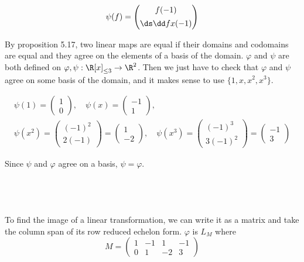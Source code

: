 \documentclass[a4paper]{article}
\begin{document}
\subsection{~}

$$\psi(f) = \begin{pmatrix} f(-1) \\[1ex] \ds \dd fx (-1) \end{pmatrix}$$

By proposition 5.17, two linear maps are equal if their domains and codomains are equal and they agree on the elements of a basis of the domain. $\varphi$ and $\psi$ are both defined on $\varphi, \psi : \R[x]_{\le 3} \to \R^2$. Then we just have to check that $\varphi$ and $\psi$ agree on some basis of the domain, and it makes sense to use $\{ 1, x, x^2, x^3 \}$.

\begin{gather*}
\psi(1) = \begin{pmatrix}1\\ 0\end{pmatrix},\quad
\psi(x) = \begin{pmatrix}-1\\ 1\end{pmatrix},\quad\\[1ex]
\psi(x^2) = \begin{pmatrix}(-1)^2\\ 2(-1)\end{pmatrix} = \begin{pmatrix}1\\ -2\end{pmatrix},\quad
\psi(x^3) = \begin{pmatrix}(-1)^3\\ 3(-1)^2\end{pmatrix} = \begin{pmatrix}-1\\ 3\end{pmatrix}
\end{gather*}

Since $\psi$ and $\varphi$ agree on a basis, $\psi = \varphi$.

\subsection{~}

To find the image of a linear transformation, we can write it as a matrix and take the column span of its row reduced echelon form. $\varphi$ is $L_M$ where $$M = \begin{pmatrix} 1 & -1 & 1 & -1\\ 0 & 1 & -2 & 3 \end{pmatrix}$$
\end{document}
